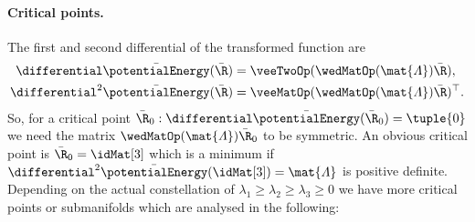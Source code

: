 \paragraph{Critical points.}
The first and second differential of the transformed function are
\begin{align}
 \differential \bar{\potentialEnergy}(\bar{\R}) &= \veeTwoOp(\wedMatOp(\mat{\varLambda}) \bar{\R}),
\\
 \differential^2 \bar{\potentialEnergy}(\bar{\R}) &= \veeMatOp(\wedMatOp(\mat{\varLambda}) \bar{\R})^\top.
\end{align}
So, for a critical point $\bar{\R}_0 : \differential \bar{\potentialEnergy}(\bar{\R}_0)=\tuple{0}$ we need the matrix $\wedMatOp(\mat{\varLambda}) \bar{\R}_0$ to be symmetric.
An obvious critical point is $\bar{\R}_0 = \idMat[3]$ which is a minimum if $\differential^2 \bar{\potentialEnergy}(\idMat[3]) = \mat{\varLambda}$ is positive definite.
Depending on the actual constellation of $\lambda_1 \geq \lambda_2 \geq \lambda_3 \geq 0$ we have more critical points or submanifolds which are analysed in the following:
